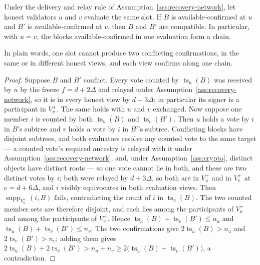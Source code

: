 \begin{lemma}
\label{lem:tsq-uniqueness}
Under the delivery and relay rule of
Assumption~\ref{ass:recovery-network}, let honest validators \(u\)
and \(v\) evaluate the same slot.  If \(B\) is
available-confirmed at \(u\) and \(B'\) is available-confirmed at \(v\),
then \(B\) and \(B'\) are compatible.  In particular, with \(u=v\), the
blocks available-confirmed in one evaluation form a chain.

In plain words, one slot cannot produce two conflicting confirmations, in
the same or in different honest views, and each view confirms along one
chain.
\end{lemma}

\begin{proof}
Suppose \(B\) and \(B'\) conflict.  Every vote counted by \(\operatorname{ts}_u(B)\) was
received by \(u\) by the freeze \(f=d+2\Delta\) and relayed
under Assumption~\ref{ass:recovery-network}, so it is in every honest view
by \(d+3\Delta\); in particular its signer is a participant in \(V_v^+\).
The same holds with \(u\) and \(v\) exchanged.  Now suppose one member
\(i\) is counted by both \(\operatorname{ts}_u(B)\) and \(\operatorname{ts}_v(B')\).  Then \(u\) holds a
vote by \(i\) in \(B\)'s subtree and \(v\) holds a vote by \(i\) in
\(B'\)'s subtree.  Conflicting blocks have disjoint subtrees, and both
evaluators resolve any counted vote to the same target --- a counted
vote's required ancestry is relayed with it under
Assumption~\ref{ass:recovery-network}, and, under
Assumption~\ref{ass:crypto}, distinct objects have distinct roots ---
so one vote cannot lie in both, and these are two distinct votes by
\(i\); both were relayed by
\(d+3\Delta\), so both are in \(V_u^+\) and in \(V_v^+\) at
\(e=d+6\Delta\), and \(i\) visibly equivocates in both evaluation views.
Then \(\operatorname{supp}_{V_u^+}(i,B)\) fails, contradicting the count
of \(i\) in \(\operatorname{ts}_u(B)\).  The two counted member sets are therefore
disjoint, and each lies among the participants of \(V_u^+\) and among the
participants of \(V_v^+\).  Hence
\(\operatorname{ts}_u(B)+\operatorname{ts}_v(B')\leq n_u\) and \(\operatorname{ts}_u(B)+\operatorname{ts}_v(B')\leq n_v\).  The two
confirmations give \(2\operatorname{ts}_u(B)>n_u\) and \(2\operatorname{ts}_v(B')>n_v\); adding them gives
\(2\operatorname{ts}_u(B)+2\operatorname{ts}_v(B')>n_u+n_v\geq2\bigl(\operatorname{ts}_u(B)+\operatorname{ts}_v(B')\bigr)\), a
contradiction.
\end{proof}

